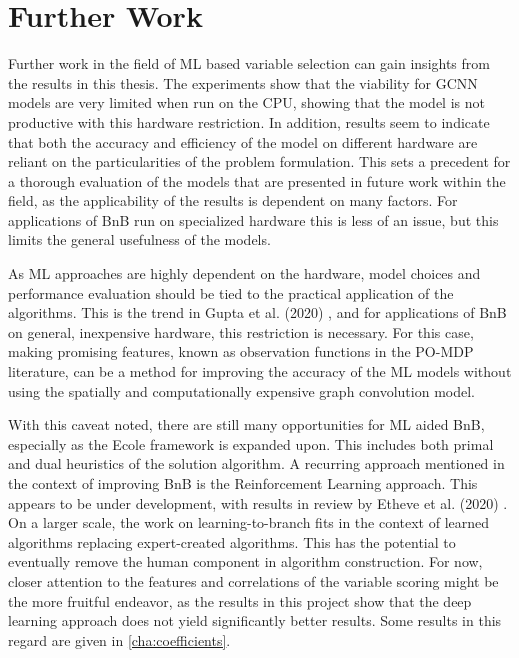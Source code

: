 \section{Further Work}\label{sec:disc_furtherwork}

Further work in the field of \gls{ML} based variable selection can gain insights from the results in this thesis.
The experiments show that the viability for \gls{GCNN} models are very limited when run on the \gls{CPU}, showing that the model is not productive with this hardware restriction. In addition, results seem to indicate that both the accuracy and efficiency of the model on different hardware are reliant on the particularities of the problem formulation. This sets a precedent for a thorough evaluation of the models that are presented in future work within the field, as the applicability of the results is dependent on many factors. For applications of \gls{BnB} run on specialized hardware this is less of an issue, but this limits the general usefulness of the models. 

As \gls{ML} approaches are highly dependent on the hardware, model choices and performance evaluation should be tied to the practical application of the algorithms. This is the trend in Gupta et al. (2020) \cite{gupta2020hybrid}, and for applications of \gls{BnB} on general, inexpensive hardware, this restriction is necessary. For this case, making promising features, known as observation functions in the \gls{PO-MDP} literature, can be a method for improving the accuracy of the \gls{ML} models without using the spatially and computationally expensive graph convolution model. 

With this caveat noted, there are still many opportunities for \gls{ML} aided \gls{BnB}, especially as the \gls{Ecole} framework is expanded upon. This includes both primal and dual heuristics of the solution algorithm.
A recurring approach mentioned in the context of improving \gls{BnB} is the Reinforcement Learning approach. This appears to be under development, with results in review by Etheve et al. (2020) \cite{etheve2020reinforcement}. On a larger scale, the work on learning-to-branch fits in the context of learned algorithms replacing expert-created algorithms. This has the potential to eventually remove the human component in algorithm construction. For now, closer attention to the features and correlations of the variable scoring might be the more fruitful endeavor, as the results in this project show that the deep learning approach does not yield significantly better results. Some results in this regard are given in \cref{cha:coefficients}. 

